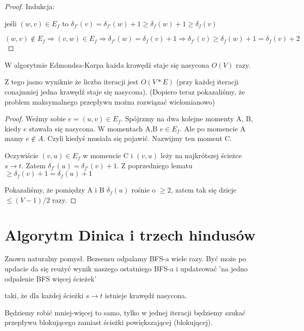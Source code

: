 
\begin{proof}
Indukcja:

jeśli $(w,v) \in E_f$ to $\delta_{f'}(v) = \delta_{f'}(w) + 1 \ge \delta_f(w) + 1 \ge \delta_f(v)$

$(w,v) \notin E_f \Rightarrow (v,w) \in E_f \Rightarrow \delta_{f'}(w) = \delta_f(v) + 1 \Rightarrow \delta_{f'}(v) \ge \delta_f(w) + 1 = \delta_f(v)+2$
\end{proof}

\begin{lemat}
    W algorytmie Edmondsa-Karpa każda krawędź staje się nasycona $O(V)$ razy.
\end{lemat}

Z tego jasno wyniknie że liczba iteracji jest $O(V*E)$ (przy każdej iteracji conajmniej jedna krawędź staje się nasycona). (Dopiero teraz pokazaliśmy, że problem maksymalnego przepływu można rozwiązać wielomianowo)

\begin{proof}
    Weźmy sobie $e = (u,v) \in E_f$. Spójrzmy na dwa kolejne momenty A, B, kiedy $e$ stawała się nasycona.
    W momentach A,B $e \in E_f$. Ale po momencie A mamy $e \notin A$. Czyli kiedyś musiała się pojawić. Nazwijmy ten moment C.
    
    Oczywiście $(v,u) \in E_f$ w momencie C i $(v,u)$ leży na najkrótszej ścieżce $s \rightarrow t$. Zatem $\delta_{f'}(u) = \delta_{f'}(v)+1$. Z poprzedniego lematu $\ge \delta_f(v) + 1 = \delta_f(u) + 1$

    Pokazaliśmy, że pomiędzy A i B $\delta_f(u)$ rośnie o $\ge 2$, zatem tak się dzieje $\le (V-1)/2$ razy.  
\end{proof}

\section{Algorytm Dinica i trzech hindusów}

Znowu naturalny pomysł. Bezsensu odpalamy BFS-a wiele razy. Być może po updacie da się reużyć wynik naszego ostatniego BFS-a i updateować 'na jedno odpalenie BFS więcej ścieżek'

\begin{defi}
    taki, że dla każdej ścieżki $s \rightarrow t$ istnieje krawędź nasycona.
\end{defi}

Będziemy robić mniej-więcej to samo, tylko w jednej iteracji będziemy szukać przepływu blokującego zamiast ścieżki powiększającej (blokującej).

